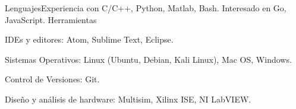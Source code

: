 \begin{cvskills}
	\cvskill
    	{Lenguajes}{Experiencia con C/C++, Python, Matlab, Bash. Interesado en Go, JavaScript.}
	\cvskill
    	{Herramientas}{\item IDEs y editores: Atom, Sublime Text, Eclipse.
        		\item Sistemas Operativos: Linux (Ubuntu, Debian, Kali Linux), Mac OS, Windows.
                \item Control de Versiones: Git.
                \item Diseño y análisis de hardware: Multisim, Xilinx ISE, NI LabVIEW.
				}
\end{cvskills}
